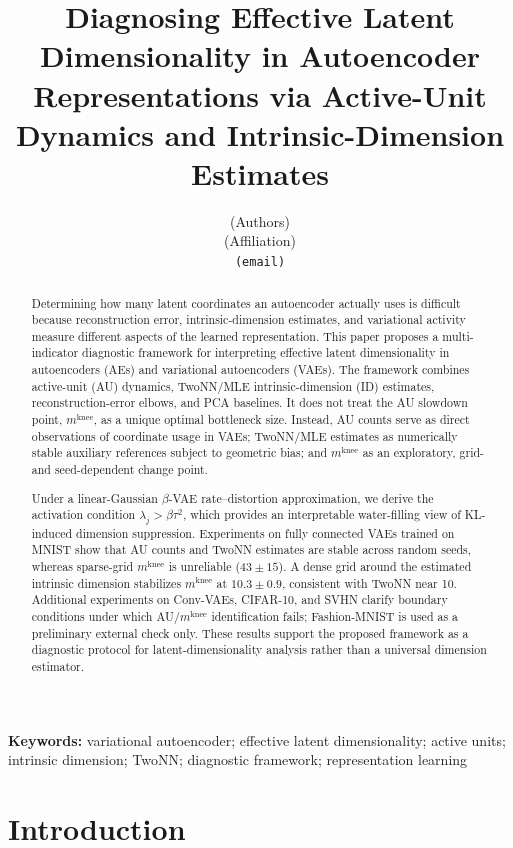 \documentclass[11pt,a4paper]{article}
\title{\textbf{Diagnosing Effective Latent Dimensionality in Autoencoder
Representations via Active-Unit Dynamics and Intrinsic-Dimension Estimates}}
\author{(Authors)\\
{\small (Affiliation)}\\
{\small \texttt{(email)}}}
\date{}
\newcommand{\mknee}{m^{\mathrm{knee}}}
\begin{document}
\maketitle

\begin{abstract}
Determining how many latent coordinates an autoencoder actually uses is
difficult because reconstruction error, intrinsic-dimension estimates, and
variational activity measure different aspects of the learned representation.
This paper proposes a multi-indicator diagnostic framework for interpreting
effective latent dimensionality in autoencoders (AEs) and variational
autoencoders (VAEs). The framework combines active-unit (AU) dynamics,
TwoNN/MLE intrinsic-dimension (ID) estimates, reconstruction-error elbows, and
PCA baselines. It does not treat the AU slowdown point, $\mknee$, as a unique
optimal bottleneck size. Instead, AU counts serve as direct observations of
coordinate usage in VAEs; TwoNN/MLE estimates as numerically stable auxiliary
references subject to geometric bias; and $\mknee$ as an exploratory,
grid- and seed-dependent change point.

Under a linear-Gaussian $\beta$-VAE rate--distortion approximation, we derive
the activation condition $\lambda_j > \beta\tau^2$, which provides an
interpretable water-filling view of KL-induced dimension suppression.
Experiments on fully connected VAEs trained on MNIST show that AU counts and
TwoNN estimates are stable across random seeds, whereas sparse-grid $\mknee$
is unreliable ($43\pm15$). A dense grid around the estimated intrinsic
dimension stabilizes $\mknee$ at $10.3\pm0.9$, consistent with TwoNN near 10.
Additional experiments on Conv-VAEs, CIFAR-10, and SVHN clarify boundary
conditions under which AU/$\mknee$ identification fails;
Fashion-MNIST is used as a preliminary external check only. These results support the proposed
framework as a diagnostic protocol for latent-dimensionality analysis rather
than a universal dimension estimator.
\end{abstract}

\noindent\textbf{Keywords:} variational autoencoder; effective latent
dimensionality; active units; intrinsic dimension; TwoNN; diagnostic framework;
representation learning

\section{Introduction}\label{sec:intro}
\end{document}
